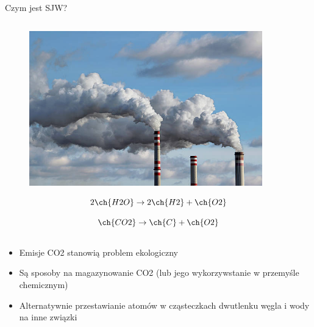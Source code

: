 \begin{columnframe}{Czym jest SJW?}
    \begin{column}{0.5\textwidth}
        \begin{figure}
            \centering
            \includegraphics[width=0.9\textwidth, frame]{images/industrial_polution_stock_image.jpg}
        \end{figure}

        \begin{equation*}
            2\ch{H2O} \rightarrow 2\ch{H2} + \ch{O2}
        \end{equation*}

        \begin{equation*}
            \ch{CO2} \rightarrow \ch{C} + \ch{O2}
        \end{equation*}
    \end{column}
    \begin{column}{0.5\textwidth}
        \begin{itemize}
            \item Emisje CO2 stanowią problem ekologiczny
            \item Są sposoby na magazynowanie CO2 (lub jego wykorzywstanie w przemyśle chemicznym)
            \item Alternatywnie przestawianie atomów w cząsteczkach dwutlenku węgla i wody na inne związki
        \end{itemize}
    \end{column}
\end{columnframe}

